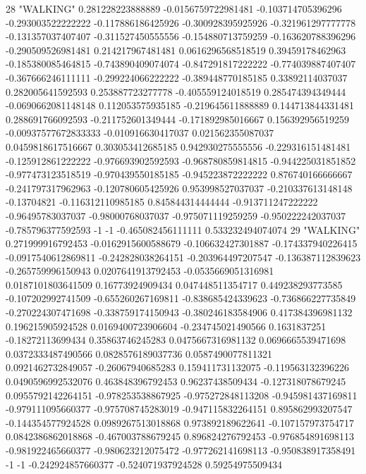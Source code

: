 28 "WALKING" 0.281228223888889 -0.0156759722981481 -0.103714705396296 -0.293003522222222 -0.117886186425926 -0.300928395925926 -0.321961297777778 -0.131357037407407 -0.311527450555556 -0.154880713759259 -0.163620788396296 -0.290509526981481 0.214217967481481 0.0616296568518519 0.39459178462963 -0.185380085464815 -0.743890409074074 -0.847291817222222 -0.774039887407407 -0.367666246111111 -0.299224066222222 -0.389448770185185 0.33892114037037 0.282005641592593 0.253887723277778 -0.405559124018519 0.285474394349444 -0.0690662081148148 0.112053575935185 -0.219645611888889 0.144713844331481 0.288691766092593 -0.211752601349444 -0.171892985016667 0.156392956519259 -0.00937577672833333 -0.010916630417037 0.021562355087037 0.0459818617516667 0.303053412685185 0.942930275555556 -0.229316151481481 -0.125912861222222 -0.976693902592593 -0.968780859814815 -0.944225031851852 -0.977473123518519 -0.970439550185185 -0.945223872222222 0.876740166666667 -0.241797317962963 -0.120780605425926 0.953998527037037 -0.210337613148148 -0.13704821 -0.116312110985185 0.845844314444444 -0.913711247222222 -0.96495783037037 -0.98000768037037 -0.975071119259259 -0.950222242037037 -0.785796377592593 -1 -1 -0.465082456111111 0.533232494074074
29 "WALKING" 0.271999916792453 -0.0162915600588679 -0.106632427301887 -0.174337940226415 -0.0917540612869811 -0.242828038264151 -0.203964497207547 -0.136387112839623 -0.265759996150943 0.0207641913792453 -0.0535669051316981 0.0187101803641509 0.16773924909434 0.047448511354717 0.449238293773585 -0.107202992741509 -0.655260267169811 -0.838685424339623 -0.736866227735849 -0.270224307471698 -0.338759174150943 -0.380246183584906 0.417384396981132 0.196215905924528 0.0169400723906604 -0.234745021490566 0.1631837251 -0.18272113699434 0.35863746245283 0.0475667316981132 0.0696665539471698 0.0372333487490566 0.0828576189037736 0.0587490077811321 0.0921462732849057 -0.26067940685283 0.159411731132075 -0.119563132396226 0.0490596992532076 0.463848396792453 0.96237438509434 -0.127318078679245 0.0955792142264151 -0.978253538867925 -0.975272848113208 -0.945981437169811 -0.979111095660377 -0.975708745283019 -0.947115832264151 0.895862993207547 -0.144354577924528 0.0989267513018868 0.973892189622641 -0.107157973754717 0.0842386862018868 -0.467003788679245 0.896824276792453 -0.976854891698113 -0.981922465660377 -0.980623212075472 -0.977262141698113 -0.950838917358491 -1 -1 -0.242924857660377 -0.524071937924528 0.59254975509434
